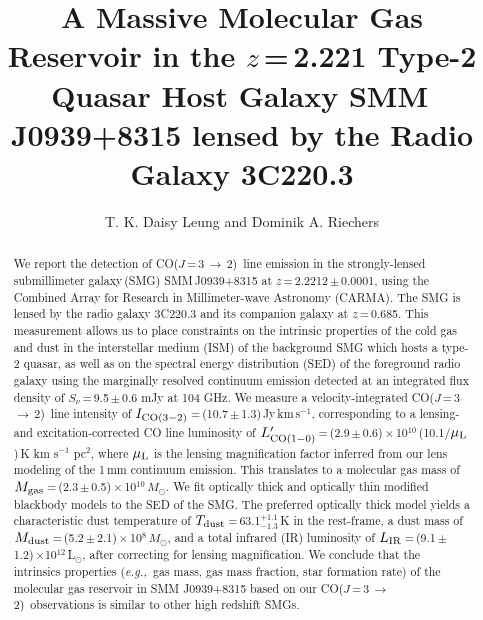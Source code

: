 \documentclass[twocolumn,apj,numberedappendix]{emulateapj}
\newcommand{\Msun}{\mbox{$M_{\odot}$}}
\newcommand{\Lsun}{\mbox{L$_{\odot}$}}
\newcommand{\CO}{\mbox{CO($J$\,=\,3\,$\rightarrow$\,2) }}
\newcommand{\Lp}{\mbox{$L^{\prime}_{\rm CO(1-0)}$}}
\newcommand{\LpU}{\mbox{K\,\,km\,\,s$^{-1}$\,\,pc$^2$}}
\newcommand{\eg}{{\sl e.g.,~}}
\newcommand{\pmOne}{\mbox{$^{-1}$}}
\begin{document}
\title{A Massive Molecular Gas Reservoir in the $z$\,=\,2.221 Type-2 Quasar Host Galaxy SMM\,J0939+8315 lensed by the Radio Galaxy 3C220.3}
\author{T. K. Daisy Leung and Dominik A. Riechers}

\begin{abstract}
We report the detection of \CO line emission in the strongly-lensed submillimeter galaxy\,(SMG) SMM\,J0939+8315 at $z$\,=\,2.2212\,$\pm$\,0.0001, using  
the Combined Array for Research in Millimeter-wave Astronomy (CARMA). 
The SMG is lensed by the radio galaxy 3C220.3 and its companion galaxy at $z$\,=\,0.685. 
This measurement allows us to place constraints on the intrinsic properties
of the cold gas and dust in the interstellar medium (ISM) of the background SMG which hosts a type-2 quasar, as well as on the spectral energy distribution (SED) of the foreground radio galaxy using the marginally resolved continuum 
emission detected at an integrated flux density of $S_\nu$\,=\,9.5\,$\pm$\,0.6 mJy
 at 104 GHz.
We measure a velocity-integrated \CO line intensity of $I_{\rm CO(3-2)}$\,=\,(10.7\,$\pm$\,1.3)\,Jy\,km\,s\pmOne,
corresponding to a lensing- and excitation-corrected CO line luminosity of \Lp\,=\,(2.9\,$\pm$\,0.6)\,$\times$\,10$^{10}$\,(10.1/$\mu_{\rm L}$)\,\LpU, where $\mu_{\rm L}$ is the lensing magnification factor inferred from our lens modeling of the 1\,mm continuum emission. 
 This
translates to a molecular gas mass of $M_{\rm gas}$\,=\,(2.3\,$\pm$\,0.5)\,$\times$\,10$^{10}$\,\Msun. We 
fit optically thick and optically thin modified blackbody models to the SED of the SMG. The preferred optically thick model yields a characteristic dust temperature of $T_{\rm dust}$\,=\,63.1$^{+1.1}_{-1.3}$\,K in the rest-frame, a dust mass of $M_{\rm dust}$\,=\,(5.2\,$\pm$\,2.1)\,$\times$\,10$^8$\,\Msun, and a total infrared (IR) luminosity of $L_{\rm IR}$\,=\,(9.1\,$\pm$\,1.2)\,$\times$10$^{12}$\,\Lsun, after correcting for lensing magnification. We conclude that the intrinsics properties (\eg gas mass, gas mass 
fraction, star formation rate) of the molecular gas reservoir in SMM
J0939+8315 based on our \CO observations is similar to other high redshift
SMGs. 
\end{abstract}
\end{document}
